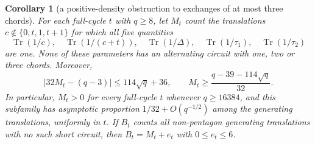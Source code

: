 \documentclass[11pt,a4paper]{article}
\newtheorem{corollary}[theorem]{Corollary}
\theoremstyle{definition}
\theoremstyle{remark}
\begin{document}
\begin{corollary}[a positive-density obstruction to exchanges of at most three chords]\label{cor:borel-short-obstruction}
For each full-cycle $t$ with $q\ge8$, let $M_t$ count the translations $c\notin\{0,t,1,t+1\}$ for which all five quantities
\[
 \operatorname{Tr}(1/c),\quad\operatorname{Tr}(1/(c+t)),\quad
 \operatorname{Tr}(1/\Delta),\quad\operatorname{Tr}(1/\tau_1),\quad
 \operatorname{Tr}(1/\tau_2)
\]
are one.  None of these parameters has an alternating circuit with one, two or three chords.  Moreover,
\[
 \bigl|32M_t-(q-3)\bigr|\le114\sqrt q+36,
 \qquad M_t\ge\frac{q-39-114\sqrt q}{32}.
\]
In particular, $M_t>0$ for every full-cycle $t$ whenever $q\ge16384$, and this subfamily has asymptotic proportion $1/32+O(q^{-1/2})$ among the generating translations, uniformly in $t$.  If $B_t$ counts all non-pentagon generating translations with no such short circuit, then $B_t=M_t+e_t$ with $0\le e_t\le6$.
\end{corollary}
\end{document}
